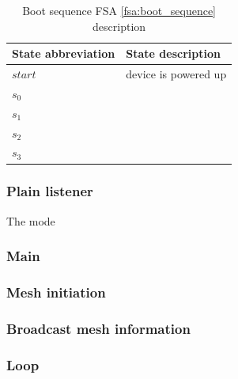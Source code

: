 				\begin{table}[h]
					\begin{center}
						\begin{tabularx}{0.85\textwidth}{@{}|Y|Y|@{}} 
							\hline
							State abbreviation & State description \\\hline
							$start$ & device is powered up\\\hline
							$s_{0}$ & \\\hline
							$s_{1}$ & \\\hline
							$s_{2}$ & \\\hline
							$s_{3}$ & \\\hline
						\end{tabularx}
						\caption[Boot sequence FSA description]{Boot sequence FSA \ref{fsa:boot_sequence} description}
						\label{table:fsm_main}
					\end{center}
				\end{table}

			\subsubsection{Plain listener}
			
				The mode
			
			\subsubsection{Main}
			
			\subsubsection{Mesh initiation}
			
			\subsubsection{Broadcast mesh information}
			
			
			\subsubsection{Loop}
			
